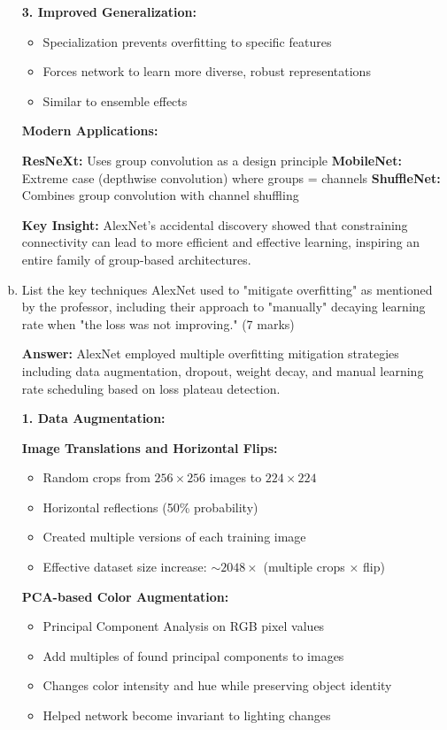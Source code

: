 \documentclass[12pt]{article}
\newcommand{\answer}[1]{{\color{answercolor}\textbf{Answer:} #1}}
\newcommand{\explanation}[1]{{\color{explanationcolor}#1}}
\begin{document}
\begin{enumerate}[(a)]
{    \textbf{3. Improved Generalization:}
    \begin{itemize}
        \item Specialization prevents overfitting to specific features
        \item Forces network to learn more diverse, robust representations
        \item Similar to ensemble effects
    \end{itemize}
    
    \textbf{Modern Applications:}
    
    \textbf{ResNeXt:} Uses group convolution as a design principle
    \textbf{MobileNet:} Extreme case (depthwise convolution) where groups = channels
    \textbf{ShuffleNet:} Combines group convolution with channel shuffling
    
    \textbf{Key Insight:}
    AlexNet's accidental discovery showed that constraining connectivity can lead to more efficient and effective learning, inspiring an entire family of group-based architectures.
    }
    
    \item List the key techniques AlexNet used to "mitigate overfitting" as mentioned by the professor, including their approach to "manually" decaying learning rate when "the loss was not improving." \hfill (7 marks)
    
    \answer{AlexNet employed multiple overfitting mitigation strategies including data augmentation, dropout, weight decay, and manual learning rate scheduling based on loss plateau detection.}
    
    \explanation{
    \textbf{1. Data Augmentation:}
    
    \textbf{Image Translations and Horizontal Flips:}
    \begin{itemize}
        \item Random crops from $256 \times 256$ images to $224 \times 224$
        \item Horizontal reflections (50\% probability)
        \item Created multiple versions of each training image
        \item Effective dataset size increase: $\sim 2048\times$ (multiple crops × flip)
    \end{itemize}
    
    \textbf{PCA-based Color Augmentation:}
    \begin{itemize}
        \item Principal Component Analysis on RGB pixel values
        \item Add multiples of found principal components to images
        \item Changes color intensity and hue while preserving object identity
        \item Helped network become invariant to lighting changes
    \end{itemize}
    
}
\end{enumerate}
\end{document}
